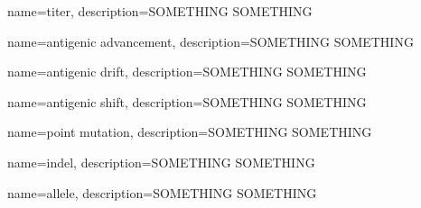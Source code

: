 {
    name=titer,
    description={SOMETHING SOMETHING}
}

{
    name=antigenic advancement,
    description={SOMETHING SOMETHING}
}

{
    name=antigenic drift,
    description={SOMETHING SOMETHING}
}

{
    name=antigenic shift,
    description={SOMETHING SOMETHING}
}

{
    name=point mutation,
    description={SOMETHING SOMETHING}
}

{
    name=indel,
    description={SOMETHING SOMETHING}
}

{
    name=allele,
    description={SOMETHING SOMETHING}
}










